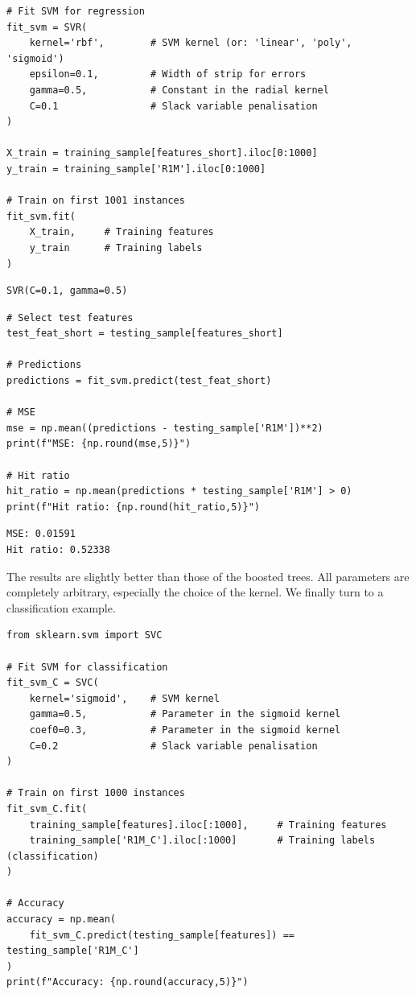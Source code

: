 \begin{verbatim}
# Fit SVM for regression
fit_svm = SVR(
    kernel='rbf',        # SVM kernel (or: 'linear', 'poly', 'sigmoid')
    epsilon=0.1,         # Width of strip for errors
    gamma=0.5,           # Constant in the radial kernel
    C=0.1                # Slack variable penalisation
)

X_train = training_sample[features_short].iloc[0:1000]
y_train = training_sample['R1M'].iloc[0:1000]

# Train on first 1001 instances
fit_svm.fit(
    X_train,     # Training features
    y_train      # Training labels
)
\end{verbatim}

\begin{verbatim}
SVR(C=0.1, gamma=0.5)
\end{verbatim}

\begin{verbatim}
# Select test features
test_feat_short = testing_sample[features_short]

# Predictions
predictions = fit_svm.predict(test_feat_short)

# MSE
mse = np.mean((predictions - testing_sample['R1M'])**2)
print(f"MSE: {np.round(mse,5)}")

# Hit ratio
hit_ratio = np.mean(predictions * testing_sample['R1M'] > 0)
print(f"Hit ratio: {np.round(hit_ratio,5)}")
\end{verbatim}

\begin{verbatim}
MSE: 0.01591
Hit ratio: 0.52338
\end{verbatim}

The results are slightly better than those of the boosted trees. All parameters are completely arbitrary, especially the choice of the kernel. We finally turn to a classification example.

\begin{verbatim}
from sklearn.svm import SVC

# Fit SVM for classification
fit_svm_C = SVC(
    kernel='sigmoid',    # SVM kernel
    gamma=0.5,           # Parameter in the sigmoid kernel
    coef0=0.3,           # Parameter in the sigmoid kernel
    C=0.2                # Slack variable penalisation
)

# Train on first 1000 instances
fit_svm_C.fit(
    training_sample[features].iloc[:1000],     # Training features
    training_sample['R1M_C'].iloc[:1000]       # Training labels (classification)
)

# Accuracy
accuracy = np.mean(
    fit_svm_C.predict(testing_sample[features]) == testing_sample['R1M_C']
)
print(f"Accuracy: {np.round(accuracy,5)}")
\end{verbatim}

